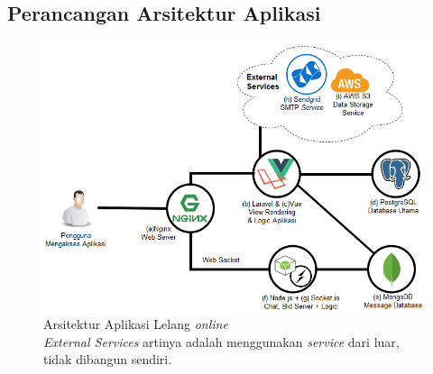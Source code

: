 \subsection{Perancangan Arsitektur Aplikasi}
	
      \begin{figure}[H]
        \centering
        \includegraphics[width=\textwidth]{images/bab3/diagram/arsitektur-awal.png}
        \caption{Arsitektur Aplikasi Lelang \textit{online} 
        		\\
                \textit{External Services} artinya adalah menggunakan \textit{service} dari luar, tidak dibangun sendiri. }
        \label{arsitektur-app-final}
      \end{figure}
    
